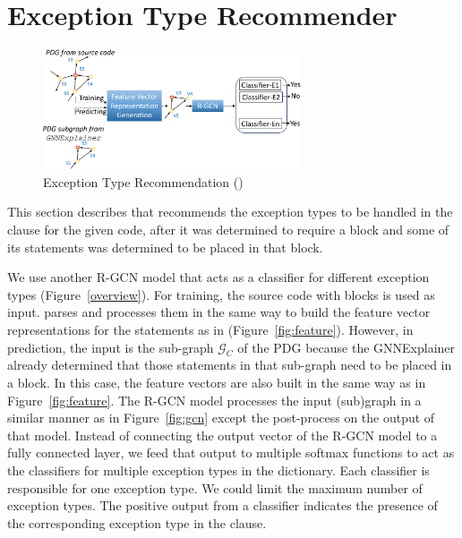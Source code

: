 \section{Exception Type Recommender}
\label{sec:type}

\begin{figure}[t]
\begin{center}
\includegraphics[width=3in]{xtype}
\vspace{-10pt}
\caption{Exception Type Recommendation ({\xtype})}
\label{fig:xtype}
\end{center}
\end{figure}

This section describes {\xtype} that recommends the exception types to
be handled in the  clause for the given code, after it was
determined to require a  block and some of its
statements was determined to be placed in that block.

We use another R-GCN model that acts as a classifier for different
exception types (Figure~\ref{overview}). For training, the source code
with  blocks is used as input. {\tool} parses and
processes them in the same way to build the feature vector
representations for the statements as in {\xblock}
(Figure~\ref{fig:feature}). However, in prediction, the input is the
sub-graph $\mathcal{G}_C$ of the PDG because the GNNExplainer already
determined that those statements in that sub-graph need to be placed
in a  block. In this case, the feature vectors are
also built in the same way as in Figure~\ref{fig:feature}. The R-GCN
model processes the input (sub)graph in a similar manner as in
Figure~\ref{fig:gcn} except the post-process on the output of that
model.  Instead of connecting the output vector of the R-GCN model to
a fully connected layer, we feed that output to multiple softmax
functions to act as the classifiers for multiple exception types in
the dictionary. Each classifier is responsible for one exception type.
We could limit the maximum number of exception types. The positive
output from a classifier indicates the presence of the corresponding
exception type in the  clause.
